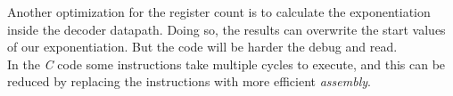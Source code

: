 \documentclass[a4paper]{article}
\begin{document}
Another optimization for the register count is to calculate the exponentiation inside the decoder datapath. Doing so, the results can overwrite the start values of our exponentiation. But the code will be harder the debug and read.\\

In the \textit{C} code some instructions take multiple cycles to execute, and this can be reduced by replacing the instructions with more efficient \textit{assembly}.\\
\end{document}
